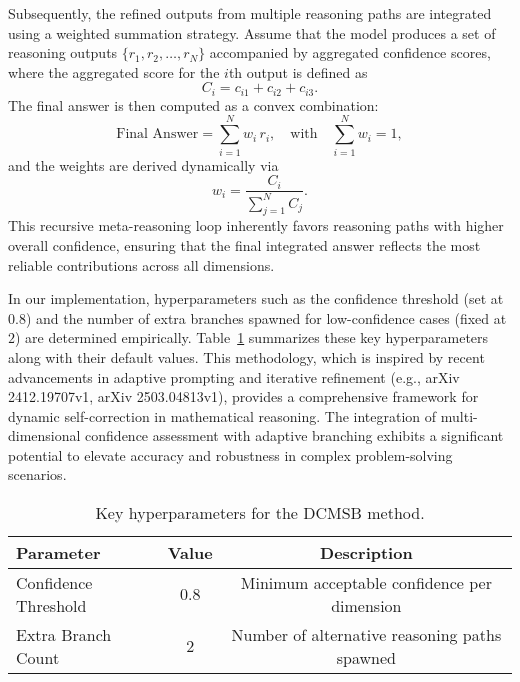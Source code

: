 \documentclass{article}
\begin{document}
Subsequently, the refined outputs from multiple reasoning paths are integrated using a weighted summation strategy. Assume that the model produces a set of reasoning outputs \(\{r_1, r_2, \ldots, r_N\}\) accompanied by aggregated confidence scores, where the aggregated score for the \(i\)th output is defined as
\[
C_i = c_{i1} + c_{i2} + c_{i3}.
\]
The final answer is then computed as a convex combination:
\[
\text{Final Answer} = \sum_{i=1}^{N} w_i\, r_i, \quad \text{with} \quad \sum_{i=1}^{N} w_i = 1,
\]
and the weights are derived dynamically via
\[
w_i = \frac{C_i}{\sum_{j=1}^{N} C_j}.
\]
This recursive meta-reasoning loop inherently favors reasoning paths with higher overall confidence, ensuring that the final integrated answer reflects the most reliable contributions across all dimensions.

In our implementation, hyperparameters such as the confidence threshold (set at \(0.8\)) and the number of extra branches spawned for low-confidence cases (fixed at \(2\)) are determined empirically. Table~\ref{tab:params} summarizes these key hyperparameters along with their default values. This methodology, which is inspired by recent advancements in adaptive prompting and iterative refinement (e.g., arXiv 2412.19707v1, arXiv 2503.04813v1), provides a comprehensive framework for dynamic self-correction in mathematical reasoning. The integration of multi-dimensional confidence assessment with adaptive branching exhibits a significant potential to elevate accuracy and robustness in complex problem-solving scenarios.

\begin{table}[ht]
\centering
\begin{tabular}{lcc}
\hline
\textbf{Parameter} & \textbf{Value} & \textbf{Description} \\
\hline
Confidence Threshold & \(0.8\) & Minimum acceptable confidence per dimension \\
Extra Branch Count  & \(2\)   & Number of alternative reasoning paths spawned \\
\hline
\end{tabular}
\caption{Key hyperparameters for the DCMSB method.}
\label{tab:params}
\end{table}
\end{document}
